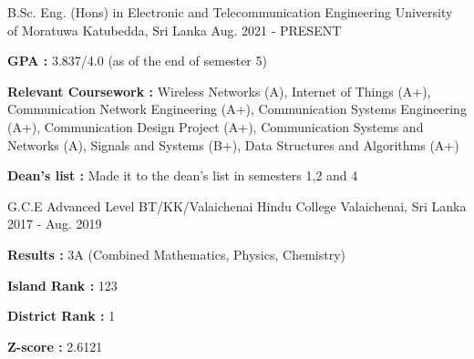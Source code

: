 

\begin{cventries}

\cventry
{B.Sc. Eng. (Hons) in Electronic and Telecommunication Engineering} %
{University of Moratuwa} %
{Katubedda, Sri Lanka} %
{Aug. 2021 - PRESENT} %
{ %
\begin{cvitems}
\item \textbf{GPA :} 3.837/4.0 (as of the end of semester 5)
\item \textbf{Relevant Coursework :} Wireless Networks (A), Internet of Things (A+), Communication Network Engineering (A+), Communication Systems Engineering (A+), Communication Design Project (A+), Communication Systems and Networks (A), Signals and Systems (B+), Data Structures and Algorithms (A+)
\item \textbf{Dean's list :} Made it to the dean's list in semesters 1,2 and 4
\end{cvitems}
}

\cventry
{G.C.E Advanced Level} %
{BT/KK/Valaichenai Hindu College} %
{Valaichenai, Sri Lanka} %
{2017 - Aug. 2019} %
{ %
\begin{cvitems}
\item \textbf{Results :} 3A (Combined Mathematics, Physics, Chemistry)
\item \textbf{Island Rank :} 123
\item \textbf{District Rank :} 1
\item \textbf{Z-score :} 2.6121
\end{cvitems}
}

\end{cventries}
